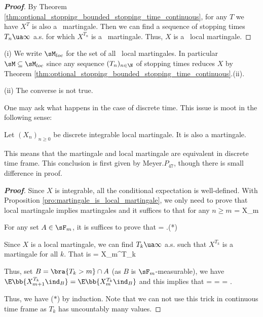 \begin{proof}[\bf Proof]
By Theorem \ref{thm:optional_stopping_bounded_stopping_time_continuous}, for any $T$ we have $X^T$ is also a \cadlag\ martingale. Then we can find a sequence of stopping times $T_n \ua \infty$ a.s. for which $X^{T_n}$ is a \cadlag\ martingale. Thus, $X$ is a \cadlag\ local martingale.%
\end{proof}

\begin{remark}
\ben
\item [(i)] We write $\sM_{loc}$ for the set of all \cadlag\ local martingales. In particular $\sM\subseteq \sM_{loc}$ since any sequence $(T_n)_{n\in\N}$ of stopping times reduces $X$ by Theorem \ref{thm:optional_stopping_bounded_stopping_time_continuous}.(ii).
\item [(ii)] The converse is not true.
\een
\end{remark}

One may ask what happens in the case of discrete time. This issue is moot in the following sense:

\begin{proposition}
Let $(X_n)_{n\geq 0}$ be discrete integrable local martingale. It is also a martingale.
\end{proposition}

\begin{remark}
This means that the martingale and local martingale are equivalent in discrete time frame. This conclusion is first given by Meyer\cite{Meyer_1972}.$P_{47}$, though there is small difference in proof.
\end{remark}

\begin{proof}[\bf Proof]
Since $X$ is integrable, all the conditional expectation is well-defined. With Proposition \ref{pro:martingale_is_local_martingale}, we only need to prove that local martingale implies martingales and it suffices to that for any $n\geq m$
\be
\E{} = X_m 
\ee

For any set $A\in \sF_m$, it is suffices to prove that
\be
\E{} = \E{}.\quad\quad (*)
\ee

Since $X$ is a local martingale, we can find $T_k\ua \infty$ a.s. such that $X^{T_k}$ is a martingale for all $k$. That is
\be
\E{} = X_m^{T_k}
\ee

Thus, set $B = \bra{T_k > m}\cap A$ (as $B$ is $\sF_m$-measurable), we have $\E\bb{X_{m+1}^{T_k} \ind_B} = \E\bb{X_m^{T_k} \ind_B}$ and this implies that
\be
\E{} = \E{} = \E{} = \E{}.
\ee

Thus, we have ($*$) by induction. Note that we can not use this trick in continuous time frame as $T_k$ has uncountably many values.%
\end{proof}


